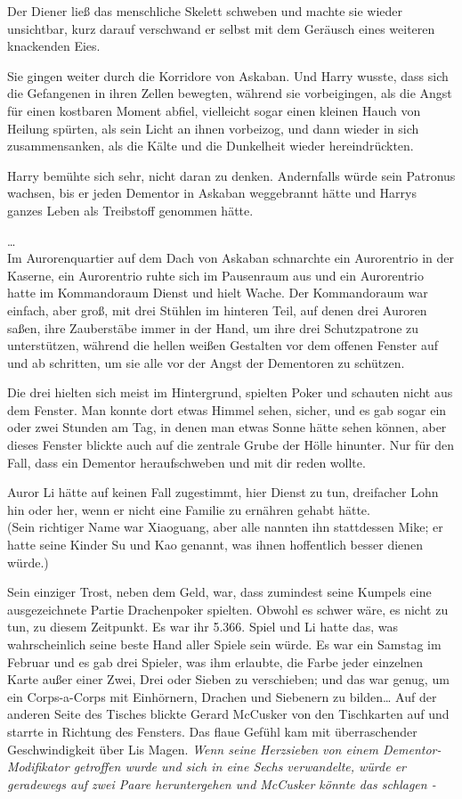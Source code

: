 {Der Diener ließ das menschliche Skelett schweben und machte sie wieder unsichtbar, kurz darauf verschwand er selbst mit dem Geräusch eines weiteren knackenden Eies.

Sie gingen weiter durch die Korridore von Askaban. Und Harry wusste, dass sich die Gefangenen in ihren Zellen bewegten, während sie vorbeigingen, als die Angst für einen kostbaren Moment abfiel, vielleicht sogar einen kleinen Hauch von Heilung spürten, als sein Licht an ihnen vorbeizog, und dann wieder in sich zusammensanken, als die Kälte und die Dunkelheit wieder hereindrückten.

Harry bemühte sich sehr, nicht daran zu denken. Andernfalls würde sein Patronus wachsen, bis er jeden Dementor in Askaban weggebrannt hätte und Harrys ganzes Leben als Treibstoff genommen hätte.

…\\ Im Aurorenquartier auf dem Dach von Askaban schnarchte ein Aurorentrio in der Kaserne, ein Aurorentrio ruhte sich im Pausenraum aus und ein Aurorentrio hatte im Kommandoraum Dienst und hielt Wache. Der Kommandoraum war einfach, aber groß, mit drei Stühlen im hinteren Teil, auf denen drei Auroren saßen, ihre Zauberstäbe immer in der Hand, um ihre drei Schutzpatrone zu unterstützen, während die hellen weißen Gestalten vor dem offenen Fenster auf und ab schritten, um sie alle vor der Angst der Dementoren zu schützen.

Die drei hielten sich meist im Hintergrund, spielten Poker und schauten nicht aus dem Fenster. Man konnte dort etwas Himmel sehen, sicher, und es gab sogar ein oder zwei Stunden am Tag, in denen man etwas Sonne hätte sehen können, aber dieses Fenster blickte auch auf die zentrale Grube der Hölle hinunter. Nur für den Fall, dass ein Dementor heraufschweben und mit dir reden wollte.

Auror Li hätte auf keinen Fall zugestimmt, hier Dienst zu tun, dreifacher Lohn hin oder her, wenn er nicht eine Familie zu ernähren gehabt hätte.\\ (Sein richtiger Name war Xiaoguang, aber alle nannten ihn stattdessen Mike; er hatte seine Kinder Su und Kao genannt, was ihnen hoffentlich besser dienen würde.)

Sein einziger Trost, neben dem Geld, war, dass zumindest seine Kumpels eine ausgezeichnete Partie Drachenpoker spielten. Obwohl es schwer wäre, es nicht zu tun, zu diesem Zeitpunkt. Es war ihr 5.366. Spiel und Li hatte das, was wahrscheinlich seine beste Hand aller Spiele sein würde. Es war ein Samstag im Februar und es gab drei Spieler, was ihm erlaubte, die Farbe jeder einzelnen Karte außer einer Zwei, Drei oder Sieben zu verschieben; und das war genug, um ein Corps-a-Corps mit Einhörnern, Drachen und Siebenern zu bilden… Auf der anderen Seite des Tisches blickte Gerard McCusker von den Tischkarten auf und starrte in Richtung des Fensters. Das flaue Gefühl kam mit überraschender Geschwindigkeit über Lis Magen. \emph{Wenn seine Herzsieben von einem Dementor-Modifikator getroffen wurde und sich in eine Sechs verwandelte, würde er geradewegs auf zwei Paare heruntergehen und McCusker könnte das schlagen -}

}
